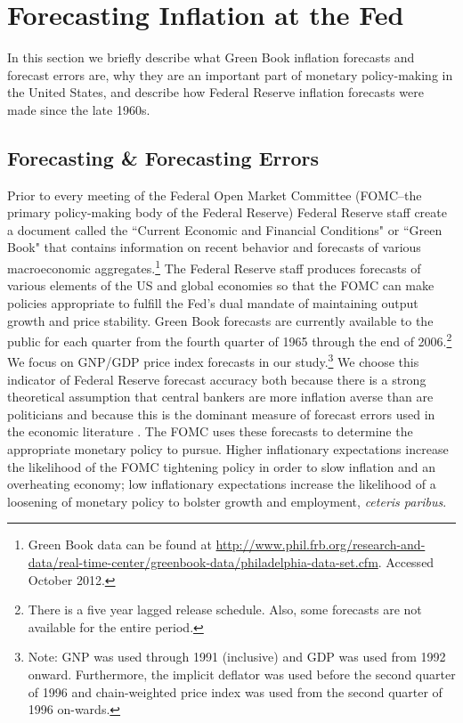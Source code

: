 \documentclass[a4paper]{article}
\begin{document}

\section{Forecasting Inflation at the Fed}

In this section we briefly describe what Green Book inflation forecasts and forecast errors are, why they are an important part of monetary policy-making in the United States, and describe how Federal Reserve inflation forecasts were made since the late 1960s.

\subsection{Forecasting \& Forecasting Errors}

Prior to every meeting of the Federal Open Market Committee (FOMC--the primary policy-making body of the Federal Reserve) Federal Reserve staff create a document called the ``Current Economic and Financial Conditions" or ``Green Book" that contains information on recent behavior and forecasts of various macroeconomic aggregates.\footnote{Green Book data can be found at {\url{http://www.phil.frb.org/research-and-data/real-time-center/greenbook-data/philadelphia-data-set.cfm}}. Accessed October 2012.} The Federal Reserve staff produces forecasts of various elements of the US and global economies so that the FOMC can make policies appropriate to fulfill the Fed's dual mandate of maintaining output growth and price stability. Green Book forecasts are currently available to the public for each quarter from the fourth quarter of 1965 through the end of 2006.\footnote{There is a five year lagged release schedule. Also, some forecasts are not available for the entire period.}  We focus on GNP/GDP price index forecasts in our study.\footnote{Note: GNP was used through 1991 (inclusive) and GDP was used from 1992 onward. Furthermore, the implicit deflator was used before the second quarter of 1996 and chain-weighted price index was used from the second quarter of 1996 on-wards.} We choose this indicator of Federal Reserve forecast accuracy both because there is a strong theoretical assumption that central bankers are more inflation averse than are politicians \citep{Cukierman1992,Mukherjee2008,Tillmann2008} and because this is the dominant measure of forecast errors used in the economic literature \citep[c.f.][]{Romer2000}. The FOMC uses these forecasts to determine the appropriate monetary policy to pursue. Higher inflationary expectations increase the likelihood of the FOMC tightening policy in order to slow inflation and an overheating economy; low inflationary expectations increase the likelihood of a loosening of monetary policy to bolster growth and employment, \emph{ceteris paribus}.
\end{document}
